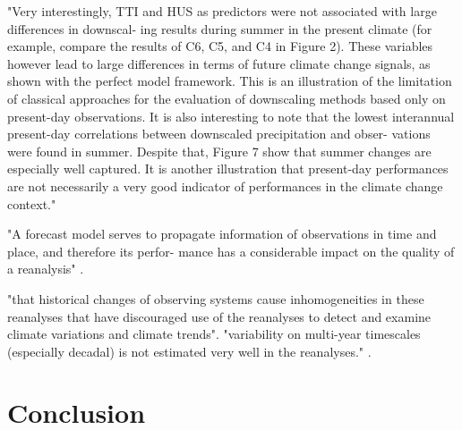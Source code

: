 \documentclass{ametsoc}
\begin{document}
"Very interestingly, TTI and HUS as predictors were not associated with large differences in downscal- ing results during summer in the present climate (for example, compare the results of C6, C5, and C4 in Figure 2). These variables however lead to large differences in terms of future climate change signals, as shown with the perfect model framework. This is an illustration of the limitation of classical approaches for the evaluation of downscaling methods based only on present-day observations. It is also interesting to note that the lowest interannual present-day correlations between downscaled precipitation and obser- vations were found in summer. Despite that, Figure 7 show that summer changes are especially well captured. It is another illustration that present-day performances are not necessarily a very good indicator of performances in the climate change context." \citep{Dayon2015}

"A forecast model serves to propagate information of observations in time and place, and therefore its perfor- mance has a considerable impact on the quality of a reanalysis" \citep{Kobayashi2015}.

"that historical changes of observing systems cause inhomogeneities in these reanalyses that have discouraged use of the reanalyses to detect and examine climate variations and climate trends".
"variability on multi-year timescales (especially decadal) is not estimated very well in the reanalyses." 
\citep{Kobayashi2014}.









\section{Conclusion}
\end{document}
